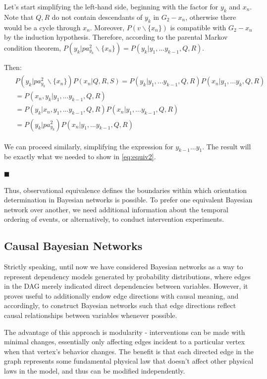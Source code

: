 \documentclass[fleqn]{article}
\numberwithin{equation}{section}
\numberwithin{theorem}{section}
\numberwithin{figure}{section}
\numberwithin{lemma}{section}
\numberwithin{corollary}{section}
\begin{document}
Let's start simplifying the left-hand side, beginning with the factor for \( y_k \) and \( x_n \). Note that \( Q,R \) do not contain descendants of \( y_k \) in \( G_2 - x_n \), otherwise there would be a cycle through \( x_n \). Moreover, \( P(v\backslash \{x_n\}) \) is compatible with \( G_2 - x_n \) by the induction hypothesis. Therefore, according to the parental Markov condition theorem, \( P(y_k | pa^2_{y_k} \backslash \{x_n\}) = P(y_k|y_1,...y_{k-1},Q,R) \).

Then:
\begin{align}
	\begin{split}
		&P(y_k|pa^2_{y_k} \backslash \{x_n\}) P(x_n | Q,R,S) = P(y_k|y_1,...y_{k-1},Q,R) P(x_n | y_1,...y_k,Q,R) \\ 
		&= P(x_n, y_k | y_1,...y_{k-1}, Q, R) \\ 
		&= P(y_{k}|x_n,y_1,...y_{k-1}, Q, R)P(x_n|y_1,...y_{k-1},Q,R) \\ 
		&= P(y_k|pa^2_{y_k})P(x_n|y_1,...y_{k-1},Q,R)
	\end{split}
\end{align}

We can proceed similarly, simplifying the expression for \( y_{k-1}\ldots y_1 \). The result will be exactly what we needed to show in \ref{eq:equiv2}.

$\blacksquare$

Thus, observational equivalence defines the boundaries within which orientation determination in Bayesian networks is possible. To prefer one equivalent Bayesian network over another, we need additional information about the temporal ordering of events, or alternatively, to conduct intervention experiments.

\subsection*{Causal Bayesian Networks}

Strictly speaking, until now we have considered Bayesian networks as a way to represent dependency models generated by probability distributions, where edges in the DAG merely indicated direct dependencies between variables. However, it proves useful to additionally endow edge directions with causal meaning, and accordingly, to construct Bayesian networks such that edge directions reflect causal relationships between variables whenever possible.

The advantage of this approach is modularity - interventions can be made with minimal changes, essentially only affecting edges incident to a particular vertex when that vertex's behavior changes. The benefit is that each directed edge in the graph represents some fundamental physical law that doesn't affect other physical laws in the model, and thus can be modified independently.
\end{document}

